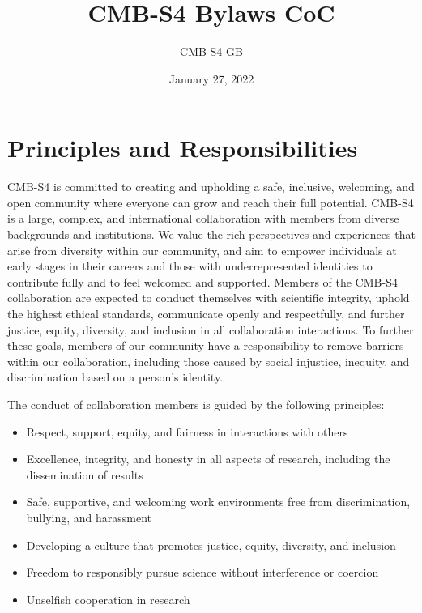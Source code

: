\documentclass[12pt]{article}
\title{CMB-S4 Bylaws CoC}
\author{CMB-S4 GB}
\date{January 27, 2022}
\begin{document}
\maketitle

                                                           

\section{Principles and Responsibilities}
CMB-S4 is committed to creating and upholding a safe, inclusive, welcoming, and open community where everyone can grow and reach their full potential. CMB-S4 is a large, complex, and international collaboration with members from diverse backgrounds and institutions. We value the rich perspectives and experiences that arise from diversity within our community, and aim to empower individuals at early stages in their careers and those with underrepresented identities to contribute fully and to feel welcomed and supported. Members of the CMB-S4 collaboration are expected to conduct themselves with scientific integrity, uphold the highest ethical standards, communicate openly and respectfully, and further justice, equity, diversity, and inclusion in all collaboration interactions. To further these goals, members of our community have a responsibility to remove barriers within our collaboration, including those caused by social injustice, inequity, and discrimination based on a person's identity.

The conduct of collaboration members is guided by the following principles:  

\begin{itemize}
    

\item Respect, support, equity, and fairness in interactions with others

\item Excellence, integrity, and honesty in all aspects of research, including the dissemination of results

\item Safe, supportive, and welcoming work environments free from discrimination, bullying, and harassment  

\item Developing a culture that promotes justice, equity, diversity, and inclusion

\item Freedom to responsibly pursue science without interference or coercion

\item Unselfish cooperation in research

\end{itemize}
\end{document}
